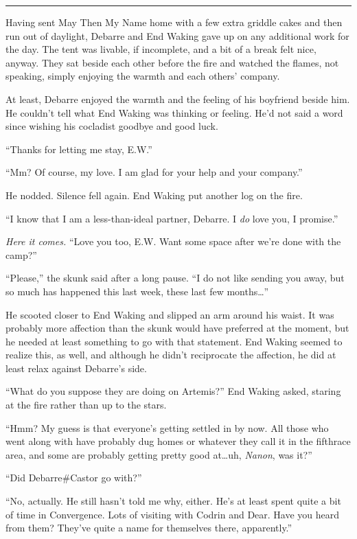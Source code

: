 \begin{center}\rule{0.5\linewidth}{0.5pt}\end{center}

Having sent May Then My Name home with a few extra griddle cakes and then run out of daylight, Debarre and End Waking gave up on any additional work for the day. The tent was livable, if incomplete, and a bit of a break felt nice, anyway. They sat beside each other before the fire and watched the flames, not speaking, simply enjoying the warmth and each others' company.

At least, Debarre enjoyed the warmth and the feeling of his boyfriend beside him. He couldn't tell what End Waking was thinking or feeling. He'd not said a word since wishing his cocladist goodbye and good luck.

``Thanks for letting me stay, E.W.''

``Mm? Of course, my love. I am glad for your help and your company.''

He nodded. Silence fell again. End Waking put another log on the fire.

``I know that I am a less-than-ideal partner, Debarre. I \emph{do} love you, I promise.''

\emph{Here it comes.} ``Love you too, E.W. Want some space after we're done with the camp?''

``Please,'' the skunk said after a long pause. ``I do not like sending you away, but so much has happened this last week, these last few months\ldots{}''

He scooted closer to End Waking and slipped an arm around his waist. It was probably more affection than the skunk would have preferred at the moment, but he needed at least something to go with that statement. End Waking seemed to realize this, as well, and although he didn't reciprocate the affection, he did at least relax against Debarre's side.

``What do you suppose they are doing on Artemis?'' End Waking asked, staring at the fire rather than up to the stars.

``Hmm? My guess is that everyone's getting settled in by now. All those who went along with have probably dug homes or whatever they call it in the fifthrace area, and some are probably getting pretty good at\ldots uh, \emph{Nanon}, was it?''

``Did Debarre\#Castor go with?''

``No, actually. He still hasn't told me why, either. He's at least spent quite a bit of time in Convergence. Lots of visiting with Codrin and Dear. Have you heard from them? They've quite a name for themselves there, apparently.''

